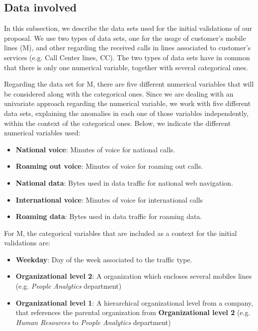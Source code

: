 \subsection{Data involved}\label{subsec:ch5-DataComms}
In this subsection, we describe the data sets used for the initial validations of our proposal. We use two types of data sets, one for the usage of customer's mobile lines (M), and other regarding the received calls in lines associated to customer's services (e.g. Call Center lines, CC). The two types of data sets have in common that there is only one numerical variable, together with several categorical ones.

Regarding the data set for M, there are five different numerical variables that will be considered along with the categorical ones. Since we are dealing with an univariate approach regarding the numerical variable, we work with five different data sets, explaining the anomalies in each one of those variables independently, within the context of the categorical ones. Below, we indicate the different numerical variables used:

\begin{itemize}
    \item \textbf{National voice}: Minutes of voice for national calls.
    \item \textbf{Roaming out voice}: Minutes of voice for roaming out calls.
    \item \textbf{National data}: Bytes used in data traffic for national web navigation.
    \item \textbf{International voice}: Minutes of voice for international calls
    \item \textbf{Roaming data}: Bytes used in data traffic for roaming data.
\end{itemize}

For M, the categorical variables that are included as a context for the initial validations are:

\begin{itemize}
    \item \textbf{Weekday}: Day of the week associated to the traffic type.
    \item \textbf{Organizational level 2}: A organization which encloses several mobiles lines (e.g. \textit{People Analytics} department)
    \item \textbf{Organizational level 1}: A hierarchical organizational level from a company, that references the parental organization from \textbf{Organizational level 2} (e.g. \textit{Human Resources} to \textit{People Analytics} department)
\end{itemize}

